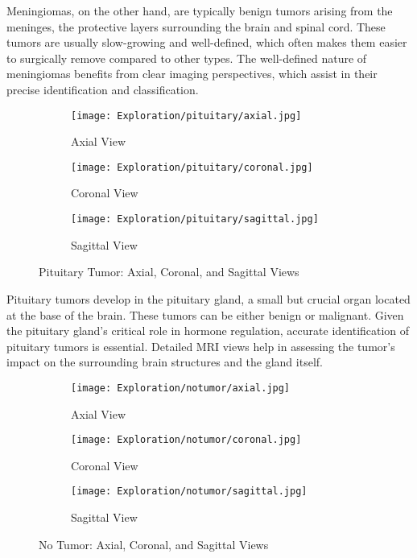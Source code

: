 Meningiomas, on the other hand, are typically benign tumors arising from the meninges, the protective layers surrounding the brain and spinal cord. These tumors are usually slow-growing and well-defined, which often makes them easier to surgically remove compared to other types. The well-defined nature of meningiomas benefits from clear imaging perspectives, which assist in their precise identification and classification.

\begin{figure}[H]
  \centering
  \begin{subfigure}[b]{0.15\textwidth}
    \centering
    \texttt{[image: Exploration/pituitary/axial.jpg]}
    \caption{Axial View}
    \label{fig:pituitary_axial}
  \end{subfigure}
  \begin{subfigure}[b]{0.15\textwidth}
    \centering
    \texttt{[image: Exploration/pituitary/coronal.jpg]}
    \caption{Coronal View}
    \label{fig:pituitary_coronal}
  \end{subfigure}
  \begin{subfigure}[b]{0.15\textwidth}
    \centering
    \texttt{[image: Exploration/pituitary/sagittal.jpg]}
    \caption{Sagittal View}
    \label{fig:pituitary_sagittal}
  \end{subfigure}
  \caption{Pituitary Tumor: Axial, Coronal, and Sagittal Views}
  \label{fig:pituitary_views}
\end{figure}

Pituitary tumors develop in the pituitary gland, a small but crucial organ located at the base of the brain. These tumors can be either benign or malignant. Given the pituitary gland's critical role in hormone regulation, accurate identification of pituitary tumors is essential. Detailed MRI views help in assessing the tumor's impact on the surrounding brain structures and the gland itself.

\begin{figure}[H]
  \centering
  \begin{subfigure}[b]{0.15\textwidth}
    \centering
    \texttt{[image: Exploration/notumor/axial.jpg]}
    \caption{Axial View}
    \label{fig:notumor_axial}
  \end{subfigure}
  \begin{subfigure}[b]{0.15\textwidth}
    \centering
    \texttt{[image: Exploration/notumor/coronal.jpg]}
    \caption{Coronal View}
    \label{fig:notumor_coronal}
  \end{subfigure}
  \begin{subfigure}[b]{0.15\textwidth}
    \centering
    \texttt{[image: Exploration/notumor/sagittal.jpg]}
    \caption{Sagittal View}
    \label{fig:notumor_sagittal}
  \end{subfigure}
  \caption{No Tumor: Axial, Coronal, and Sagittal Views}
  \label{fig:notumor_views}
\end{figure}

